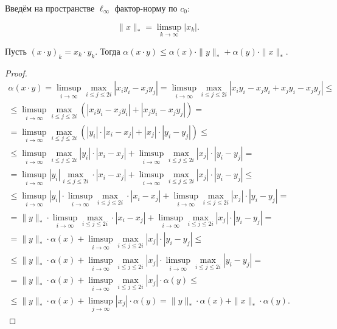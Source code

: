 Введём на пространстве $\ell_\infty$ фактор-норму по $c_0$:


\begin{equation}
	\|x\|_* = \limsup_{k\to\infty} |x_k|
	.
\end{equation}

\begin{theorem}
	\label{thm:alpha_xy}
	Пусть $(x\cdot y)_k = x_k\cdot y_k$.
	Тогда
	$\alpha(x\cdot y)\leq \alpha(x)\cdot \|y\|_* + \alpha(y)\cdot \|x\|_*$.
\end{theorem}

\begin{proof}
	\begin{multline}
		\alpha(x\cdot y)
		=
		\limsup_{i\to\infty} \max_{i\leq j \leq 2i} |x_i y_i - x_j y_j|
		=
		\limsup_{i\to\infty} \max_{i\leq j \leq 2i} |x_i y_i - x_j y_i + x_j y_i - x_j y_j|
		\leq
		\\ \leq
		\limsup_{i\to\infty} \max_{i\leq j \leq 2i} \left(|x_i y_i - x_j y_i| + |x_j y_i - x_j y_j| \right)
		=
		\\=
		\limsup_{i\to\infty} \max_{i\leq j \leq 2i} \left(|y_i|\cdot|x_i - x_j| + |x_j|\cdot|y_i - y_j| \right)
		\leq
		\\ \leq
		\limsup_{i\to\infty} \max_{i\leq j \leq 2i} |y_i|\cdot|x_i - x_j| + \limsup_{i\to\infty} \max_{i\leq j \leq 2i}|x_j|\cdot|y_i - y_j|
		=
		\\ =
		\limsup_{i\to\infty} |y_i| \max_{i\leq j \leq 2i} \cdot|x_i - x_j| + \limsup_{i\to\infty} \max_{i\leq j \leq 2i}|x_j|\cdot|y_i - y_j|
		\leq
		\\ \leq
		\limsup_{i\to\infty} |y_i| \cdot \limsup_{i\to\infty} \max_{i\leq j \leq 2i} \cdot|x_i - x_j| + \limsup_{i\to\infty} \max_{i\leq j \leq 2i}|x_j|\cdot|y_i - y_j|
		=
		\\ =
		\|y\|_* \cdot \limsup_{i\to\infty} \max_{i\leq j \leq 2i} \cdot|x_i - x_j| + \limsup_{i\to\infty} \max_{i\leq j \leq 2i}|x_j|\cdot|y_i - y_j|
		=
		\\ =
		\|y\|_* \cdot \alpha(x) + \limsup_{i\to\infty} \max_{i\leq j \leq 2i}|x_j|\cdot|y_i - y_j|
		\leq
		\\ \leq
		\|y\|_* \cdot \alpha(x) + \limsup_{i\to\infty} \max_{i\leq j \leq 2i}|x_j|\cdot\limsup_{i\to\infty} \max_{i\leq j \leq 2i}|y_i - y_j|
		=
		\\ =
		\|y\|_* \cdot \alpha(x) + \limsup_{i\to\infty} \max_{i\leq j \leq 2i}|x_j|\cdot \alpha(y)
		\leq
		\\ \leq
		\|y\|_* \cdot \alpha(x) + \limsup_{j\to\infty} |x_j|\cdot \alpha(y)
		=
		\|y\|_* \cdot \alpha(x) + \|x\|_* \cdot \alpha(y)
		.
	\end{multline}
\end{proof}

